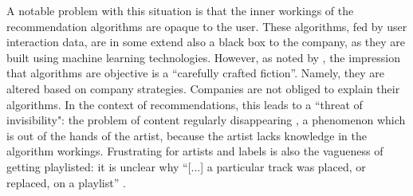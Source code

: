 A notable problem with this situation is that the inner workings of the recommendation algorithms are opaque to the user. These algorithms, fed by user interaction data, are in some extend also a black box to the company, as they are built using machine learning technologies. However, as noted by \citep{gillespie2014relevance}, the impression that algorithms are objective is a ``carefully crafted fiction''. Namely, they are altered based on company strategies. Companies are not obliged to explain their algorithms. In the context of recommendations, this leads to a ``threat of invisibility": the problem of content regularly disappearing \citep{bucher2018if}, a phenomenon which is out of the hands of the artist, because the artist lacks knowledge in the algorithm workings. Frustrating for artists and labels is also the vagueness of getting playlisted: it is unclear why ``[...] a particular track was placed, or replaced, on a playlist'' \citep{prey2020locating}. 

